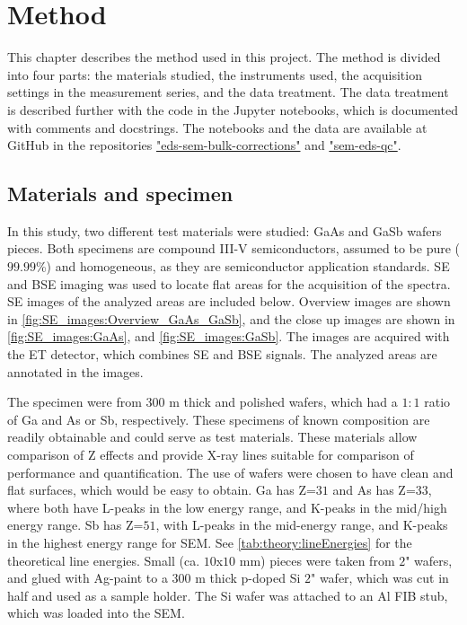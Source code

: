 \chapter{Method}
\label{ch:method}

This chapter describes the method used in this project.
The method is divided into four parts: the materials studied, the instruments used, the acquisition settings in the measurement series, and the data treatment.
The data treatment is described further with the code in the Jupyter notebooks, which is documented with comments and docstrings.
The notebooks and the data are available at GitHub in the repositories \href{https://github.com/brynjarmorka/eds-sem-bulk-corrections}{"eds-sem-bulk-corrections"} and \href{https://github.com/brynjarmorka/sem-eds-qc}{"sem-eds-qc"}.





\section{Materials and specimen}
\label{method:materials}

In this study, two different test materials were studied: GaAs and GaSb wafers pieces.
Both specimens are compound III-V semiconductors, assumed to be pure ($99.99$\%) and homogeneous, as they are semiconductor application standards.
SE and BSE imaging was used to locate flat areas for the acquisition of the spectra.
SE images of the analyzed areas are included below.
Overview images are shown in \cref{fig:SE_images:Overview_GaAs_GaSb}, and the close up images are shown in \cref{fig:SE_images:GaAs}, and \cref{fig:SE_images:GaSb}. %
The images are acquired with the ET detector, which combines SE and BSE signals.
The analyzed areas are annotated in the images.


The specimen were from $300$ \textmu m thick and polished wafers, which had a $1:1$ ratio of Ga and As or Sb, respectively.
These specimens of known composition are readily obtainable and could serve as test materials.
These materials allow comparison of Z effects and provide X-ray lines suitable for comparison of performance and quantification.
The use of wafers were chosen to have clean and flat surfaces, which would be easy to obtain.
Ga has Z=$31$ and As has Z=$33$, where both have L-peaks in the low energy range, and K-peaks in the mid/high energy range.
Sb has Z=$51$, with L-peaks in the mid-energy range, and K-peaks in the highest energy range for SEM.
See \cref{tab:theory:lineEnergies} for the theoretical line energies.
Small (ca. $10$x$10$ mm) pieces were taken from $2$" wafers, and glued with Ag-paint to a $300$ \textmu m thick p-doped Si $2$" wafer, which was cut in half and used as a sample holder.
The Si wafer was attached to an Al FIB stub, which was loaded into the SEM.


